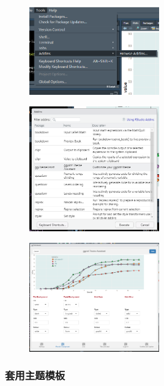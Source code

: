 \documentclass[11pt,a4paper,oneside]{book}
\begin{document}
\begin{figure}[H]
	\centering
	\includegraphics[width=0.5\textwidth]{screenshot010}
\end{figure}
\begin{figure}[H]
	\centering
	\includegraphics[width=0.5\textwidth]{screenshot011}
\end{figure}
\begin{figure}[H]
	\centering
	\includegraphics[width=0.5\textwidth]{screenshot013}
\end{figure}

\subsubsection{套用主题模板}
\end{document}

